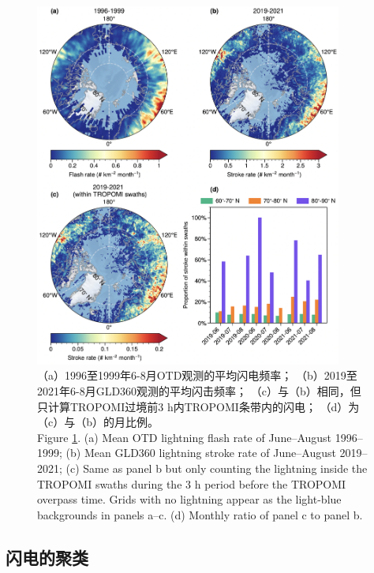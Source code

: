 \clearpage\vspace*{\fill}
\begin{figure}[H]
\centering
\includegraphics[width=0.9\textwidth]{./figures/arctic_lightning_distribution.png}
\caption{
（a）1996至1999年6-8月OTD观测的平均闪电频率；
（b）2019至2021年6-8月GLD360观测的平均闪击频率；
（c）与（b）相同，但只计算TROPOMI过境前3 h内TROPOMI条带内的闪电；
（d）为（c）与（b）的月比例。\\
Figure \ref{fig:arctic_lightning_distribution}.
(a) Mean OTD lightning flash rate of June--August 1996--1999;
(b) Mean GLD360 lightning stroke rate of June--August 2019--2021;
(c) Same as panel b but only counting the lightning inside the TROPOMI swaths during the 3 h period before the TROPOMI overpass time.
Grids with no lightning appear as the light-blue backgrounds in panels a--c.
(d) Monthly ratio of panel c to panel b.
}
\label{fig:arctic_lightning_distribution}
\end{figure}
\vspace*{\fill}\clearpage

\subsection*{闪电的聚类}

